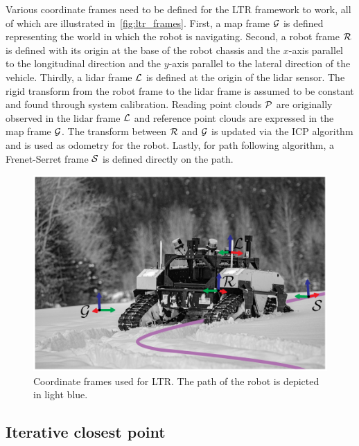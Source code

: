 Various coordinate frames need to be defined for the \ac{LTR} framework to work, all of which are illustrated in~\autoref{fig:ltr_frames}.
First, a map frame $\mathcal{G}$ is defined representing the world in which the robot is navigating.
Second, a robot frame $\mathcal{R}$ is defined with its origin at the base of the robot chassis and the $x$-axis parallel to the longitudinal direction and the $y$-axis parallel to the lateral direction of the vehicle.
Thirdly, a lidar frame $\mathcal{L}$ is defined at the origin of the lidar sensor.
The rigid transform from the robot frame to the lidar frame \transform{\robotf}{\lidarf} is assumed to be constant and found through system calibration.
Reading point clouds $\mathcal{P}$ are originally observed in the lidar frame $\mathcal{L}$ and reference point clouds are expressed in the map frame $\mathcal{G}$.
The transform between $\mathcal{R}$ and $\mathcal{G}$ \transform{\robotf}{\mapf} is updated via the \ac{ICP} algorithm and is used as odometry for the robot.
Lastly, for path following algorithm, a Frenet-Serret frame $\mathcal{S}$ is defined directly on the path.

\begin{figure} [htpb]
	\centering
	\includegraphics[width=.6\linewidth]{figs/warthog_frames/warthog_frames.pdf}
	\caption{Coordinate frames used for \ac{LTR}. The path of the robot is depicted in light blue. }
	\label{fig:ltr_frames}
\end{figure}

\subsection{Iterative closest point}
\label{ICP}


